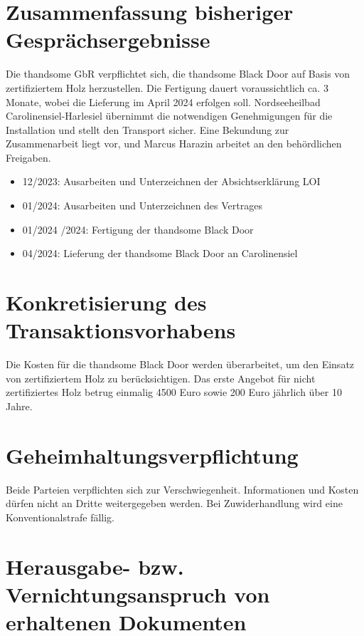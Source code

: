 \section[Gesprächsergebnisse]{Zusammenfassung bisheriger Gesprächsergebnisse}

Die thandsome GbR verpflichtet sich, die thandsome Black Door auf Basis von zertifiziertem Holz herzustellen. 
Die Fertigung dauert voraussichtlich ca. 3 Monate, wobei die Lieferung im April 2024 erfolgen soll. 
Nordseeheilbad Carolinensiel-Harlesiel übernimmt die notwendigen Genehmigungen für die Installation und stellt 
den Transport sicher. Eine Bekundung zur Zusammenarbeit liegt vor, und Marcus Harazin 
arbeitet an den behördlichen Freigaben. 


\begin{itemize}
    \item 12/2023: Ausarbeiten und Unterzeichnen der Absichtserklärung \- LOI
    \item 01/2024: Ausarbeiten und Unterzeichnen des Vertrages 
    \item 01/2024 /2024: Fertigung der thandsome Black Door 
    \item 04/2024: Lieferung der thandsome Black Door an Carolinensiel 
    \end{itemize}
    


\section[Konkretisierung]{Konkretisierung des Transaktionsvorhabens}

Die Kosten für die thandsome Black Door werden überarbeitet, um den Einsatz von zertifiziertem
Holz zu berücksichtigen. Das erste Angebot für nicht zertifiziertes Holz betrug einmalig
4500 Euro sowie 200 Euro jährlich über 10 Jahre. 


\section[Geheimhaltungsverpflichtungt]{Geheimhaltungsverpflichtung}

Beide Parteien verpflichten sich zur Verschwiegenheit. 
Informationen und Kosten dürfen nicht an Dritte weitergegeben werden.
Bei Zuwiderhandlung wird eine Konventionalstrafe fällig. 

  
\section[erhaltene Dokumente]{Herausgabe- bzw. Vernichtungsanspruch von erhaltenen Dokumenten}


